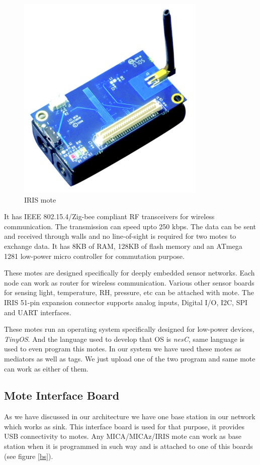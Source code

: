 \documentclass [a4paper,12pt]{book}
\begin{document}
\vspace{0.5cm}
\begin{figure}[!h]
\begin{center}
\includegraphics[scale=0.45]{images/17.jpg}
\caption{IRIS mote}
\label{iris}
\end{center}
\end{figure}

It has IEEE 802.15.4/Zig-bee compliant RF transceivers for wireless communication. The transmission can speed upto 250 kbps. The data can be sent and received through walls and no line-of-sight is required for two motes to exchange data. It has 8KB of RAM, 128KB of flash memory and an ATmega 1281 low-power micro controller for commutation purpose.

These motes are designed specifically for deeply embedded sensor networks. Each node can work as router for wireless communication. Various other sensor boards for sensing light, temperature, RH, pressure, etc can be attached with mote. The IRIS 51-pin expansion connector supports analog inputs, Digital I/O, I2C, SPI and UART interfaces.

These motes run an operating system specifically designed for low-power devices, \emph{TinyOS}. And the language used to develop that OS is \emph{nesC}, same language is used to even program this motes. In our system we have used these motes as mediators as well as tags. We just upload one of the two program and same mote can work as either of them.

\subsection{Mote Interface Board}
As we have discussed in our architecture we have one base station in our network which works as sink. This interface board is used for that purpose, it provides USB connectivity to motes. Any MICA/MICAz/IRIS mote can work as base station when it is programmed in such way and is attached to one of this boards (see figure \ref{bs}).
\end{document}
